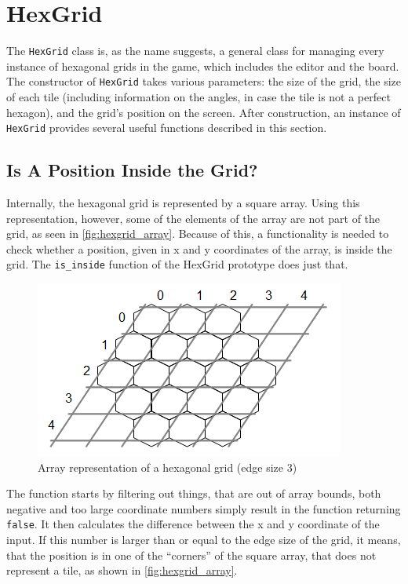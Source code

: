 \section{HexGrid}
\label{sec:hexgrid}

The \texttt{HexGrid} class is, as the name suggests, a general class for managing every instance of hexagonal grids in the game, which includes the editor and the board.
The constructor of \texttt{HexGrid} takes various parameters: the size of the grid, the size of each tile (including information on the angles, in case the tile is not a perfect hexagon), and the grid's position on the screen.
After construction, an instance of \texttt{HexGrid} provides several useful functions described in this section.

\subsection{Is A Position Inside the Grid?}
Internally, the hexagonal grid is represented by a square array.
Using this representation, however, some of the elements of the array are not part of the grid, as seen in \autoref{fig:hexgrid_array}.
Because of this, a functionality is needed to check whether a position, given in x and y coordinates of the array, is inside the grid.
The \texttt{is\_inside} function of the HexGrid prototype does just that.

\begin{figure}[ht]
\begin{center}
	\includegraphics[scale=1]{img/hexgrid_array.png}
	\caption{Array representation of a hexagonal grid (edge size 3)}
	\label{fig:hexgrid_array}
\end{center}
\end{figure}

The function starts by filtering out things, that are out of array bounds, both negative and too large coordinate numbers simply result in the function returning \verb|false|.
It then calculates the difference between the x and y coordinate of the input.
If this number is larger than or equal to the edge size of the grid, it means, that the position is in one of the ``corners'' of the square array, that does not represent a tile, as shown in \autoref{fig:hexgrid_array}.

